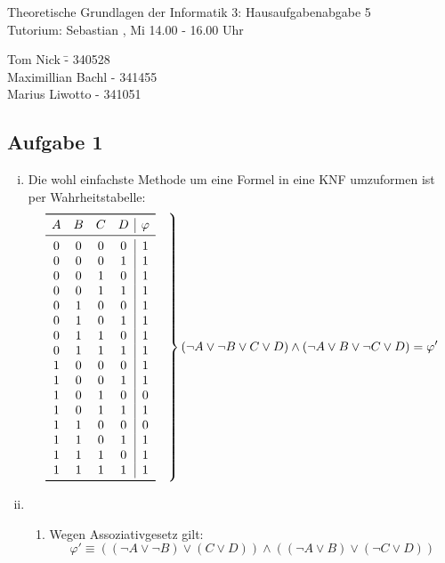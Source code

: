 \documentclass[a4paper,10pt]{article}
\begin{document}
\begin{center}
\Large{Theoretische Grundlagen der Informatik 3: Hausaufgabenabgabe 5} \\
\large{Tutorium: Sebastian , Mi 14.00 - 16.00 Uhr}
\end{center}
\begin{tabbing}
Tom Nick \hspace{2cm}\= - 340528\\
Maximillian Bachl \> - 341455 \\
Marius Liwotto\> -  341051
\end{tabbing}
\subsection*{Aufgabe 1}
\begin{enumerate}[(i)]
\item 	Die wohl einfachste Methode um eine Formel in eine KNF umzuformen ist per Wahrheitstabelle:
	\[
	\left.\begin{array}{cccc|c}
		\toprule 
		A & B & C & D & \varphi\\
		\midrule
		0 & 0 & 0 & 0 & 1\\
		0 & 0 & 0 & 1 & 1\\
		0 & 0 & 1 & 0 & 1\\
		0 & 0 & 1 & 1 & 1\\
		0 & 1 & 0 & 0 & 1\\
		0 & 1 & 0 & 1 & 1\\
		0 & 1 & 1 & 0 & 1\\
		0 & 1 & 1 & 1 & 1\\
		1 & 0 & 0 & 0 & 1\\
		1 & 0 & 0 & 1 & 1\\
		1 & 0 & 1 & 0 & 0\\
		1 & 0 & 1 & 1 & 1\\
		1 & 1 & 0 & 0 & 0\\
		1 & 1 & 0 & 1 & 1\\
		1 & 1 & 1 & 0 & 1\\
		1 & 1 & 1 & 1 & 1\\
		\bottomrule
		\end{array} \quad \right\} ( \lnot A \lor  \lnot B \lor C \lor D) \land (\lnot A \lor B \lor \lnot C \lor D) = \varphi'
	 \]
\item  	\begin{enumerate}[$\quad$ 1.]
		\item  	Wegen Assoziativgesetz gilt: \[\varphi' \equiv  ( (\lnot A \lor  \lnot B) \lor (C \lor D)) \land ((\lnot A \lor B) \lor (\lnot C \lor D)) \]

\end{enumerate}
\end{enumerate}
\end{document}
